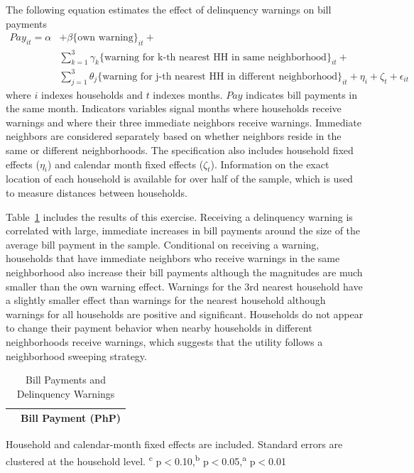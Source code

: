 \documentclass[12pt,table]{article}
\begin{document}
The following equation estimates the effect of delinquency warnings on bill payments
\begin{align*}
Pay_{it} = \alpha &+ \beta  \{ \text{own warning} \}_{it} + \\
 &\sum_{k=1}^{3} \gamma_k \{ \text{warning for k-th nearest HH in same neighborhood} \}_{it} +  \\
 &\sum_{j=1}^{3} \theta_j \{ \text{warning for j-th nearest HH in different neighborhood} \}_{it} + \eta_i + \zeta_t + \epsilon_{it}
\end{align*}
where $i$ indexes households and $t$ indexes months.  $Pay$ indicates bill payments in the same month.  Indicators variables signal months where households receive warnings and where their three immediate neighbors receive warnings.  Immediate neighbors are considered separately based on whether neighbors reside in the same or different neighborhoods.  The specification also includes household fixed effects ($\eta_i$) and calendar month fixed effects ($\zeta_t$).  Information on the exact location of each household is available for over half of the sample, which is used to measure distances between households.

Table~\ref{table:paywarning} includes the results of this exercise.  Receiving a delinquency warning is correlated with large, immediate increases in bill payments around the size of the average bill payment in the sample.  Conditional on receiving a warning, households that have immediate neighbors who receive warnings in the same neighborhood also increase their bill payments although the magnitudes are much smaller than the own warning effect.  Warnings for the 3rd nearest household have a slightly smaller effect than warnings for the nearest household although warnings for all households are positive and significant.  Households do not appear to change their payment behavior when nearby households in different neighborhoods receive warnings, which suggests that the utility follows a neighborhood sweeping strategy.

\begin{table}[!ht]
\small
\centering
\begin{threeparttable}
\caption{Bill Payments and Delinquency Warnings}\label{table:paywarning}
\vspace{-2mm}
\begin{tabular}{lc}
\toprule
 & \small Bill Payment (PhP) \\[.5em]
 \toprule

\bottomrule
\end{tabular}
\begin{tablenotes}
\footnotesize
\item Household and calendar-month fixed effects are included. Standard errors are clustered at the household level.  \textsuperscript{c} p$<$0.10,\textsuperscript{b} p$<$0.05,\textsuperscript{a} p$<$0.01 
\end{tablenotes}
\end{threeparttable}
\end{table}
\end{document}
